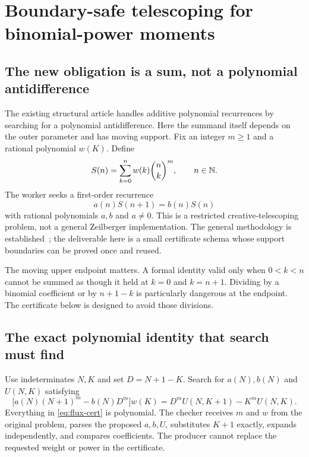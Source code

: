 \section{Boundary-safe telescoping for binomial-power moments}
\label{sec:telescoping}

\subsection{The new obligation is a sum, not a polynomial antidifference}

The existing structural article handles additive polynomial recurrences by searching for a polynomial antidifference. Here the summand itself depends on the outer parameter and has moving support. Fix an integer $m\ge1$ and a rational polynomial $w(K)$. Define
\begin{equation}
 S(n)=\sum_{k=0}^{n}w(k)\binom nk^m,\qquad n\in\mathbb N.
 \label{eq:moment}
\end{equation}
The worker seeks a first-order recurrence
\begin{equation}
 a(n)S(n+1)=b(n)S(n)
 \label{eq:recurrence}
\end{equation}
with rational polynomials $a,b$ and $a\ne0$. This is a restricted creative-telescoping problem, not a general Zeilberger implementation. The general methodology is established~\cite{koutschan}; the deliverable here is a small certificate schema whose support boundaries can be proved once and reused.

The moving upper endpoint matters. A formal identity valid only when $0<k<n$ cannot be summed as though it held at $k=0$ and $k=n+1$. Dividing by a binomial coefficient or by $n+1-k$ is particularly dangerous at the endpoint. The certificate below is designed to avoid those divisions.

\subsection{The exact polynomial identity that search must find}

Use indeterminates $N,K$ and set $D=N+1-K$. Search for $a(N),b(N)$ and $U(N,K)$ satisfying
\begin{equation}
 \big[a(N)(N+1)^m-b(N)D^m\big]w(K)
 =D^m U(N,K+1)-K^m U(N,K).
 \label{eq:flux-cert}
\end{equation}
Everything in \eqref{eq:flux-cert} is polynomial. The checker receives $m$ and $w$ from the original problem, parses the proposed $a,b,U$, substitutes $K+1$ exactly, expands independently, and compares coefficients. The producer cannot replace the requested weight or power in the certificate.

